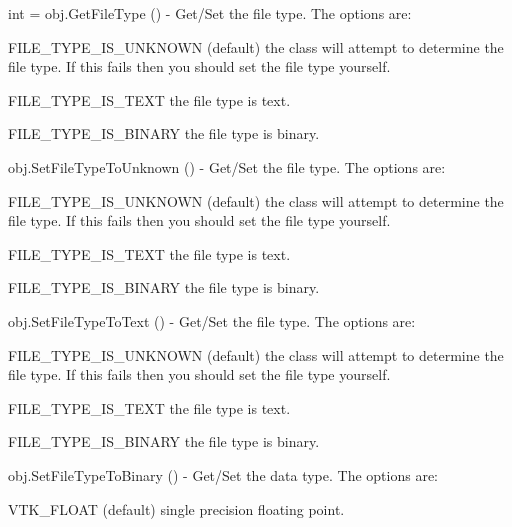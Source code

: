 \begin{DoxyItemize}
\begin{DoxyItemize}
\end{DoxyItemize}
\item {\ttfamily int = obj.\-Get\-File\-Type ()} -\/ Get/\-Set the file type. The options are\-:
\begin{DoxyItemize}
\item F\-I\-L\-E\-\_\-\-T\-Y\-P\-E\-\_\-\-I\-S\-\_\-\-U\-N\-K\-N\-O\-W\-N (default) the class will attempt to determine the file type. If this fails then you should set the file type yourself.
\item F\-I\-L\-E\-\_\-\-T\-Y\-P\-E\-\_\-\-I\-S\-\_\-\-T\-E\-X\-T the file type is text.
\item F\-I\-L\-E\-\_\-\-T\-Y\-P\-E\-\_\-\-I\-S\-\_\-\-B\-I\-N\-A\-R\-Y the file type is binary.  
\end{DoxyItemize}
\item {\ttfamily obj.\-Set\-File\-Type\-To\-Unknown ()} -\/ Get/\-Set the file type. The options are\-:
\begin{DoxyItemize}
\item F\-I\-L\-E\-\_\-\-T\-Y\-P\-E\-\_\-\-I\-S\-\_\-\-U\-N\-K\-N\-O\-W\-N (default) the class will attempt to determine the file type. If this fails then you should set the file type yourself.
\item F\-I\-L\-E\-\_\-\-T\-Y\-P\-E\-\_\-\-I\-S\-\_\-\-T\-E\-X\-T the file type is text.
\item F\-I\-L\-E\-\_\-\-T\-Y\-P\-E\-\_\-\-I\-S\-\_\-\-B\-I\-N\-A\-R\-Y the file type is binary.  
\end{DoxyItemize}
\item {\ttfamily obj.\-Set\-File\-Type\-To\-Text ()} -\/ Get/\-Set the file type. The options are\-:
\begin{DoxyItemize}
\item F\-I\-L\-E\-\_\-\-T\-Y\-P\-E\-\_\-\-I\-S\-\_\-\-U\-N\-K\-N\-O\-W\-N (default) the class will attempt to determine the file type. If this fails then you should set the file type yourself.
\item F\-I\-L\-E\-\_\-\-T\-Y\-P\-E\-\_\-\-I\-S\-\_\-\-T\-E\-X\-T the file type is text.
\item F\-I\-L\-E\-\_\-\-T\-Y\-P\-E\-\_\-\-I\-S\-\_\-\-B\-I\-N\-A\-R\-Y the file type is binary.  
\end{DoxyItemize}
\item {\ttfamily obj.\-Set\-File\-Type\-To\-Binary ()} -\/ Get/\-Set the data type. The options are\-:
\begin{DoxyItemize}
\item V\-T\-K\-\_\-\-F\-L\-O\-A\-T (default) single precision floating point.

\end{DoxyItemize}
\end{DoxyItemize}
